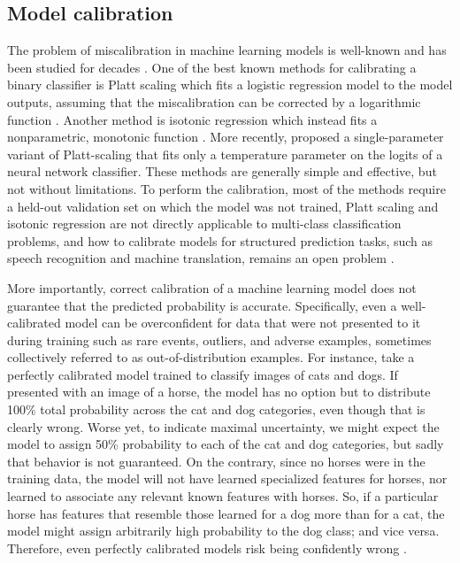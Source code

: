 \subsection{Model calibration} \label{subsec:model-calibration}
% 
The problem of miscalibration in machine learning models is well-known and has been studied for decades \parencite{lewis_sequential_1995, platt_probabilistic_1999, garczarek_classification_2002, zadrozny_transforming_2002, bennett_using_2003, niculescu-mizil_predicting_2005}. One of the best known methods for calibrating a binary classifier is Platt scaling which fits a logistic regression model to the model outputs, assuming that the miscalibration can be corrected by a logarithmic function \parencite{platt_probabilistic_1999}. Another method is isotonic regression which instead fits a nonparametric, monotonic function \parencite{zadrozny_transforming_2002}. 
More recently, \textcite{guo_calibration_2017} proposed a single-parameter variant of Platt-scaling that fits only a temperature parameter on the logits of a neural network classifier. 
These methods are generally simple and effective, but not without limitations. 
To perform the calibration, most of the methods require a held-out validation set on which the model was not trained, Platt scaling and isotonic regression are not directly applicable to multi-class classification problems, and how to calibrate models for structured prediction tasks, such as speech recognition and machine translation, remains an open problem \parencite{astudillo_uncertainty_2010, astudillo_integration_2013, jayashankar_detecting_2020}.

More importantly, correct calibration of a machine learning model does not guarantee that the predicted probability is accurate. 
Specifically, even a well-calibrated model can be overconfident for data that were not presented to it during training such as rare events, outliers, and adverse examples, sometimes collectively referred to as out-of-distribution examples. 
For instance, take a perfectly calibrated model trained to classify images of cats and dogs. If presented with an image of a horse, the model has no option but to distribute 100\% total probability across the cat and dog categories, even though that is clearly wrong. 
Worse yet, to indicate maximal uncertainty, we might expect the model to assign 50\% probability to each of the cat and dog categories, but sadly that behavior is not guaranteed. 
On the contrary, since no horses were in the training data, the model will not have learned specialized features for horses, nor learned to associate any relevant known features with horses. So, if a particular horse has features that resemble those learned for a dog more than for a cat, the model might assign arbitrarily high probability to the dog class; and vice versa. Therefore, even perfectly calibrated models risk being confidently wrong \parencite{zhou_survey_2022}. 


